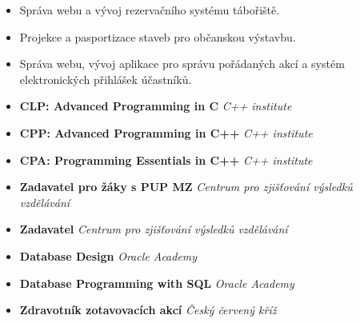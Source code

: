 \documentclass[10pt,a4paper,ragged2e]{altacv}
\begin{document}
\divider

\begin{itemize}
\item Správa webu a vývoj rezervačního systému tábořiště.
\end{itemize}
 
\divider

\begin{itemize}
\item Projekce a pasportizace staveb pro občanskou výstavbu.
\end{itemize}

\divider

\begin{itemize}
\item Správa webu, vývoj aplikace pro správu pořádaných akcí a systém elektronických přihlášek účastníků.

\end{itemize}


\smallskip
\begin{itemize}
\item \textbf{CLP: Advanced Programming in C} \textit{C++ institute}
\item \textbf{CPP: Advanced Programming in C++} \textit{C++ institute}
\item \textbf{CPA: Programming Essentials in C++} \textit{C++ institute}
\item \textbf{Zadavatel pro žáky s PUP MZ} \textit{Centrum pro zjišťování výsledků vzdělávání}
\item \textbf{Zadavatel} \textit{Centrum pro zjišťování výsledků vzdělávání}
\item \textbf{Database Design} \textit{Oracle Academy}
\item \textbf{Database Programming with SQL} \textit{Oracle Academy}
\item \textbf{Zdravotník zotavovacích akcí} \textit{Český červený kříž}
\end{itemize}


\clearpage

\end{document}
